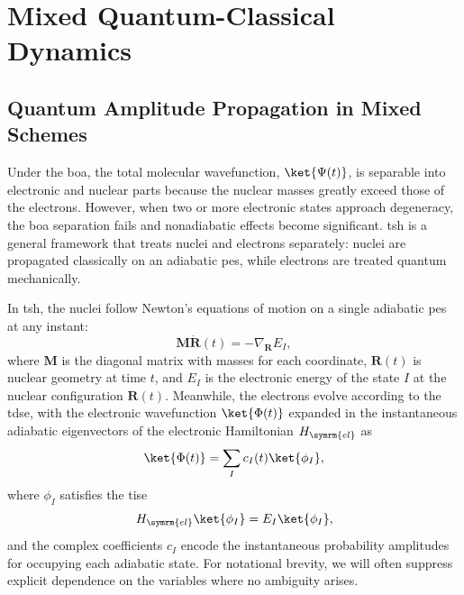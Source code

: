 \chapter{Mixed Quantum-Classical Dynamics}\label{sec:mixed_quantum_classical_dynamics}
\section{Quantum Amplitude Propagation in Mixed Schemes}\label{sec:quantum_amplitude_propagation_in_mixed_themes}
Under the \acrfull{boa}, the total molecular wavefunction, $\ket{\Psi(t)}$, is separable into electronic and nuclear parts because the nuclear masses greatly exceed those of the electrons. However, when two or more electronic states approach degeneracy, the \acrshort{boa} separation fails and nonadiabatic effects become significant. \acrfull{tsh} is a general framework that treats nuclei and electrons separately: nuclei are propagated classically on an adiabatic \acrfull{pes}, while electrons are treated quantum mechanically.

In \acrshort{tsh}, the nuclei follow Newton's equations of motion on a single adiabatic \acrshort{pes} at any instant:
\begin{equation}
\symbf{M}\ddot{\symbf{R}}(t)=-\nabla_{\symbf{R}}E_I,
\end{equation}
where $\symbf{M}$ is the diagonal matrix with masses for each coordinate, $\symbf{R}(t)$ is nuclear geometry at time $t$, and $E_I$ is the electronic energy of the state $I$ at the nuclear configuration $\symbf{R}(t)$. Meanwhile, the electrons evolve according to the \acrshort{tdse}, with the electronic wavefunction $\ket{\Phi(t)}$ expanded in the instantaneous adiabatic eigenvectors of the electronic Hamiltonian $H_{\symrm{el}}$ as
\begin{equation}
\ket{\Phi(t)}=\sum_I c_I(t)\ket{\phi_I},
\end{equation}
where $\phi_I$ satisfies the \acrfull{tise}
\begin{equation}
H_{\symrm{el}}\ket{\phi_I}=E_I\ket{\phi_I},
\end{equation}
and the complex coefficients $c_I$ encode the instantaneous probability amplitudes for occupying each adiabatic state. For notational brevity, we will often suppress explicit dependence on the variables where no ambiguity arises.


